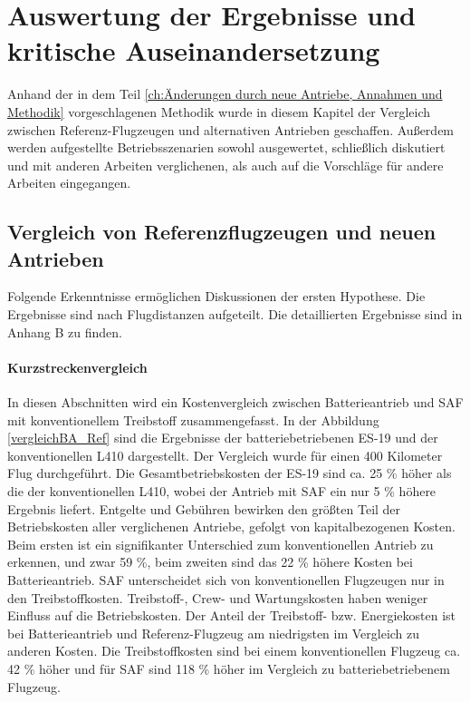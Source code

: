 \chapter{Auswertung der Ergebnisse und kritische Auseinandersetzung}
\label{ch:Auswertung der Ergebnisse}
Anhand der in dem Teil \ref{ch:Änderungen durch neue Antriebe, Annahmen und Methodik} 
vorgeschlagenen Methodik wurde in diesem Kapitel der Vergleich zwischen 
Referenz-Flugzeugen und alternativen Antrieben geschaffen.
Außerdem werden aufgestellte Betriebsszenarien sowohl ausgewertet, 
schließlich diskutiert und mit anderen Arbeiten verglichenen, 
als auch auf die Vorschläge für andere Arbeiten eingegangen.

\section{Vergleich von Referenzflugzeugen und neuen Antrieben}
\label{s:Ergebnisse_Flugzeuge}
Folgende Erkenntnisse ermöglichen Diskussionen der ersten Hypothese. 
Die Ergebnisse sind nach Flugdistanzen aufgeteilt. Die detaillierten Ergebnisse sind in Anhang B zu finden.\\
%
\subsubsection{Kurzstreckenvergleich}
%
In diesen Abschnitten wird ein Kostenvergleich zwischen Batterieantrieb 
und SAF mit konventionellem Treibstoff zusammengefasst.
In der Abbildung \ref{vergleichBA_Ref} sind die Ergebnisse der 
batteriebetriebenen ES-19 und der konventionellen L410 dargestellt.
Der Vergleich wurde für einen 400 Kilometer Flug durchgeführt.
%
Die Gesamtbetriebskosten der ES-19 sind ca. 25 \% höher als die der konventionellen L410, 
wobei der Antrieb mit SAF ein nur 5 \% höhere Ergebnis liefert. 
Entgelte und Gebühren bewirken den größten Teil der Betriebskosten aller verglichenen Antriebe, 
gefolgt von kapitalbezogenen Kosten. 
Beim ersten ist ein signifikanter Unterschied zum konventionellen Antrieb zu erkennen, 
und zwar 59 \%, beim zweiten sind das 22 \% höhere Kosten bei Batterieantrieb. 
%
SAF unterscheidet sich von konventionellen Flugzeugen nur in den Treibstoffkosten.
Treibstoff-, Crew- und Wartungskosten haben weniger Einfluss auf die Betriebskosten.
Der Anteil der Treibstoff- bzw. Energiekosten ist bei Batterieantrieb und Referenz-Flugzeug 
am niedrigsten im Vergleich zu anderen Kosten. 
Die Treibstoffkosten sind bei einem konventionellen Flugzeug ca. 42 \% höher und für SAF sind 118 \% höher
im Vergleich zu batteriebetriebenem Flugzeug. 

